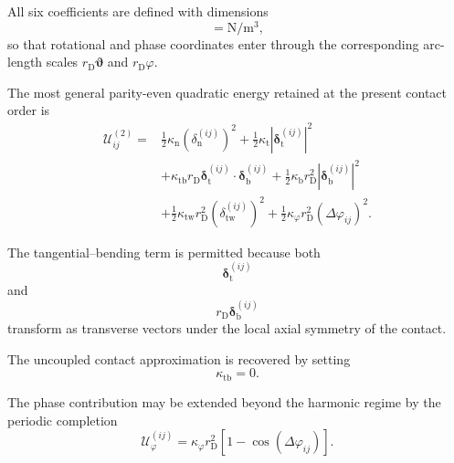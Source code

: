 All six coefficients are defined with dimensions
\begin{equation}
    [\kappa] = \mathrm{N/m^3},
\end{equation}
so that rotational and phase coordinates enter through the corresponding arc-length scales $r_{\mathrm{D}}\boldsymbol{\vartheta}$ and $r_{\mathrm{D}}\varphi$.

The most general parity-even quadratic energy retained at the present contact order is
\begin{equation}
    \boxed{
    \begin{aligned}
        \mathcal{U}_{ij}^{(2)} ={}& \frac{1}{2} \kappa_{\mathrm{n}} \left( \delta_{\mathrm{n}}^{(ij)} \right)^2 + \frac{1}{2} \kappa_{\mathrm{t}} \left| \boldsymbol{\delta}_{\mathrm{t}}^{(ij)} \right|^2 \\[3pt]
        &+ \kappa_{\mathrm{tb}}r_{\mathrm{D}} \boldsymbol{\delta}_{\mathrm{t}}^{(ij)} \cdot \boldsymbol{\delta}_{\mathrm{b}}^{(ij)} + \frac{1}{2} \kappa_{\mathrm{b}}r_{\mathrm{D}}^2 \left| \boldsymbol{\delta}_{\mathrm{b}}^{(ij)} \right|^2 \\[3pt]
        &+ \frac{1}{2} \kappa_{\mathrm{tw}}r_{\mathrm{D}}^2 \left( \delta_{\mathrm{tw}}^{(ij)} \right)^2 + \frac{1}{2} \kappa_{\varphi}r_{\mathrm{D}}^2 \left( \Delta\varphi_{ij} \right)^2.
    \end{aligned}
    }
\end{equation}

The tangential--bending term is permitted because both
\begin{equation}
    \boldsymbol{\delta}_{\mathrm{t}}^{(ij)}
\end{equation}
and
\begin{equation}
    r_{\mathrm{D}} \boldsymbol{\delta}_{\mathrm{b}}^{(ij)}
\end{equation}
transform as transverse vectors under the local axial symmetry of the contact.

The uncoupled contact approximation is recovered by setting
\begin{equation}
    \kappa_{\mathrm{tb}} = 0.
\end{equation}

The phase contribution may be extended beyond the harmonic regime by the periodic completion
\begin{equation}
    \boxed{ \mathcal{U}_{\varphi}^{(ij)} = \kappa_{\varphi}r_{\mathrm{D}}^2 \left[ 1 - \cos \left( \Delta\varphi_{ij} \right) \right] }.
\end{equation}

